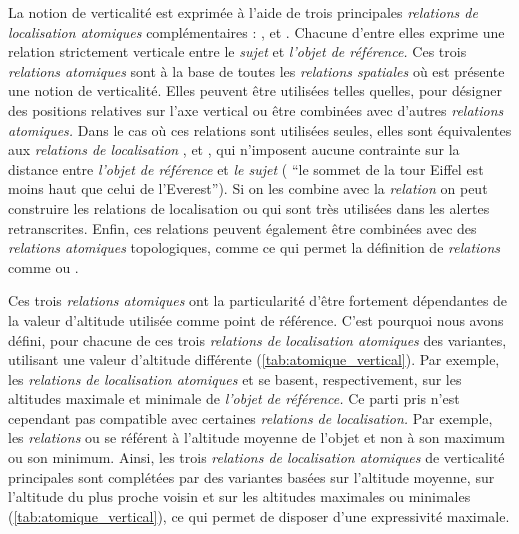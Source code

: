 La notion de verticalité est exprimée à l'aide de trois principales
\emph{relations de localisation atomiques} complémentaires :
,
 et
. Chacune
d'entre elles exprime une relation strictement verticale entre le
\emph{sujet} et \emph{l'objet de référence.} Ces trois \emph{relations
  atomiques} sont à la base de toutes les \emph{relations spatiales}
où est présente une notion de verticalité. Elles peuvent être
utilisées telles quelles, pour désigner des positions relatives sur
l'axe vertical ou être combinées avec d'autres \emph{relations
  atomiques.} Dans le cas où ces relations sont utilisées seules,
elles sont équivalentes aux \emph{relations de localisation}
,
 et
, qui n'imposent aucune contrainte sur
la distance entre \emph{l'objet de référence} et \emph{le sujet} (\eg
\enquote{le sommet de la tour Eiffel est moins haut que celui de
  l’Everest}). Si on les combine avec la \emph{relation}
 on peut construire les
relations de localisation  ou
 qui sont très utilisées dans
les alertes retranscrites. Enfin, ces relations peuvent également être
combinées avec des \emph{relations atomiques} topologiques, comme
 ce qui permet la définition de
\emph{relations} comme  ou
.

Ces trois \emph{relations atomiques} ont la particularité d'être
fortement dépendantes de la valeur d'altitude utilisée comme point de
référence. C'est pourquoi nous avons défini, pour chacune de ces trois
\emph{relations de localisation atomiques} des variantes, utilisant
une valeur d'altitude différente
(\autoref{tab:atomique_vertical}). Par exemple, les \emph{relations de
  localisation atomiques}
 et
 se
basent, respectivement, sur les altitudes maximale et minimale de
\emph{l'objet de référence.} Ce parti pris n'est cependant pas
compatible avec certaines \emph{relations de localisation.} Par
exemple, les \emph{relations}
 ou
 se référent à l'altitude
moyenne de l'objet et non à son maximum ou son minimum. Ainsi, les
trois \emph{relations de localisation atomiques} de verticalité
principales sont complétées par des variantes basées sur l'altitude
moyenne, sur l'altitude du plus proche voisin et sur les altitudes
maximales ou minimales (\autoref{tab:atomique_vertical}), ce qui
permet de disposer d'une expressivité maximale.

